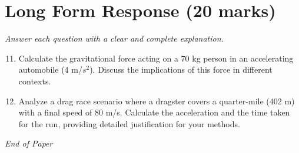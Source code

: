 \documentclass[12pt]{article}
\begin{document}
\section*{Long Form Response (20 marks)}
\textit{Answer each question with a clear and complete explanation.}
\begin{enumerate}[label=\arabic*.]
\setcounter{enumi}{10}
\item Calculate the gravitational force acting on a 70 kg person in an accelerating automobile (4 m/$s^2$). Discuss the implications of this force in different contexts.
\item Analyze a drag race scenario where a dragster covers a quarter-mile (402 m) with a final speed of 80 m/s. Calculate the acceleration and the time taken for the run, providing detailed justification for your methods.
\end{enumerate}

\vfill
\noindent\textit{End of Paper}
\end{document}

